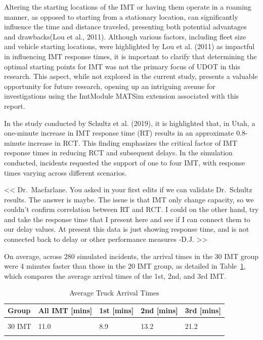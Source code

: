 \documentclass[fancy, oneside, mastersfancy, ms]{byuthesis}
\begin{document}
Altering the starting locations of the IMT or having them operate in a
roaming manner, as opposed to starting from a stationary location, can
significantly influence the time and distance traveled, presenting both
potential advantages and drawbacks(Lou et al., 2011). Although various
factors, including fleet size and vehicle starting locations, were
highlighted by Lou et al. (2011) as impactful in influencing IMT
response times, it is important to clarify that determining the optimal
starting points for IMT was not the primary focus of UDOT in this
research. This aspect, while not explored in the current study, presents
a valuable opportunity for future research, opening up an intriguing
avenue for investigations using the ImtModule MATSim extension
associated with this report.

In the study conducted by Schultz et al. (2019), it is highlighted that,
in Utah, a one-minute increase in IMT response time (RT) results in an
approximate 0.8-minute increase in RCT. This finding emphasizes the
critical factor of IMT response times in reducing RCT and subsequent
delays. In the simulation conducted, incidents requested the support of
one to four IMT, with response times varying across different scenarios.

\textless\textless{} Dr.~Macfarlane. You asked in your first edits if we
can validate Dr.~Schultz results. The answer is maybe. The issue is that
IMT only change capacity, so we couldn't confirm correlation between RT
and RCT. I could on the other hand, try and take the response time that
I present here and see if I can connect them to our delay values. At
present this data is just showing response time, and is not connected
back to delay or other performance measures -D.J.
\textgreater\textgreater{}

On average, across 280 simulated incidents, the arrival times in the 30
IMT group were 4 minutes faster than those in the 20 IMT group, as
detailed in Table~\ref{tbl-truck_arrival_table}, which compares the
average arrival times of the 1st, 2nd, and 3rd IMT.

\hypertarget{tbl-truck_arrival_table}{}
\begin{table}
\caption{\label{tbl-truck_arrival_table}Average Truck Arrival Times }\tabularnewline

\centering
\begin{tabular}[t]{lllll}
\toprule
\textbf{Group} & \textbf{All IMT [mins]} & \textbf{1st [mins]} & \textbf{2nd [mins]} & \textbf{3rd [mins]}\\
\midrule
\cellcolor{gray!6}{20 IMT} & \cellcolor{gray!6}{15.0} & \cellcolor{gray!6}{11.1} & \cellcolor{gray!6}{21.1} & \cellcolor{gray!6}{28.9}\\
30 IMT & 11.0 & 8.9 & 13.2 & 21.2\\
\cellcolor{gray65}{\cellcolor{gray!6}{Number of Incidents}} & \cellcolor{gray65}{\cellcolor{gray!6}{280}} & \cellcolor{gray65}{\cellcolor{gray!6}{280}} & \cellcolor{gray65}{\cellcolor{gray!6}{116}} & \cellcolor{gray65}{\cellcolor{gray!6}{23}}\\
\bottomrule
\end{tabular}
\end{table}
\end{document}
